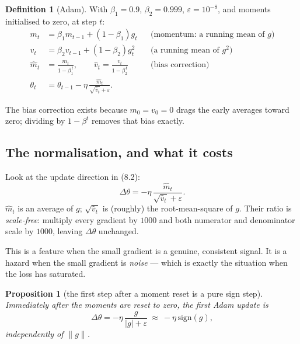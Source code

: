 \documentclass[11pt]{article}
\newtheorem{proposition}[theorem]{Proposition}
\theoremstyle{definition}
\newtheorem{definition}[theorem]{Definition}
\begin{document}
\begin{definition}[Adam]
With $\beta_1 = 0.9$, $\beta_2 = 0.999$, $\varepsilon = 10^{-8}$, and moments initialised to zero, at step $t$:
\[
\begin{aligned}
m_t &= \beta_1 m_{t-1} + (1-\beta_1)g_t & &\text{(momentum: a running mean of $g$)}\\
v_t &= \beta_2 v_{t-1} + (1-\beta_2)g_t^2 & &\text{(a running mean of $g^2$)}\\
\hat m_t &= \frac{m_t}{1-\beta_1^{\,t}},\qquad
\hat v_t = \frac{v_t}{1-\beta_2^{\,t}} & &\text{(bias correction)}\\
\theta_t &= \theta_{t-1} - \eta\,\frac{\hat m_t}{\sqrt{\hat v_t}+\varepsilon}. & &
\end{aligned}
\tag{8.2}
\]
\end{definition}

The bias correction exists because $m_0 = v_0 = 0$ drags the early averages toward zero; dividing by $1-\beta^t$ removes that bias exactly.

\subsection{The normalisation, and what it costs}

Look at the update direction in (8.2):
\[
\Delta\theta = -\eta\,\frac{\hat m_t}{\sqrt{\hat v_t}+\varepsilon}.
\]
$\hat m_t$ is an average of $g$; $\sqrt{\hat v_t}$ is (roughly) the root-mean-square of $g$. Their ratio is \emph{scale-free}: multiply every gradient by $1000$ and both numerator and denominator scale by $1000$, leaving $\Delta\theta$ unchanged.

\begin{center}
\end{center}

This is a feature when the small gradient is a genuine, consistent signal. It is a hazard when the small gradient is \emph{noise} --- which is exactly the situation when the loss has saturated.

\begin{proposition}[the first step after a moment reset is a pure sign step]
\label{prop:adam-first-step}
Immediately after the moments are reset to zero, the first Adam update is
\[
\Delta\theta = -\eta\,\frac{g}{|g|+\varepsilon} \ \approx\ -\eta\,\mathrm{sign}(g),
\]
independently of $\|g\|$.
\end{proposition}
\end{document}
